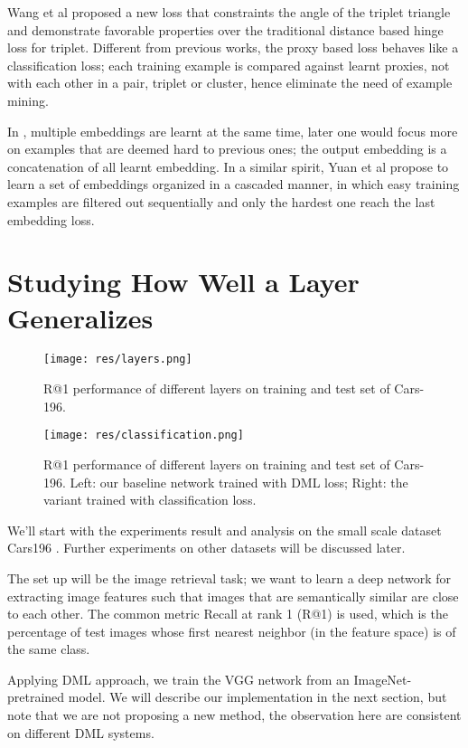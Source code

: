 \documentclass[10pt,twocolumn,letterpaper]{article}
\begin{document}
Wang et al \cite{wang2017deep} proposed a new loss that constraints the angle of the triplet triangle and demonstrate favorable properties over the traditional distance based hinge loss for triplet. Different from previous works, the proxy based loss \cite{movshovitz2017no} behaves like a classification loss; each training example is compared against learnt proxies, not with each other in a pair, triplet or cluster, hence eliminate the need of example mining.

In \cite{opitz2017bier}, multiple embeddings are learnt at the same time, later one would focus more on examples that are deemed hard to previous ones; the output embedding is a concatenation of all learnt embedding.
In a similar spirit, Yuan et al \cite{yuan2016hard} propose to learn a set of embeddings organized in a cascaded manner, in which easy training examples are filtered out sequentially and only the hardest one reach the last embedding loss. 

\section{Studying How Well a Layer Generalizes}

\begin{figure*}
  \texttt{[image: res/layers.png]}
  \caption{R@1 performance of different layers on training and test set of Cars-196.}
  \label{fig:layers}
\end{figure*}

\begin{figure}
  \texttt{[image: res/classification.png]}
  \caption{R@1 performance of different layers on training and test set of Cars-196. Left: our baseline network trained with DML loss; Right: the variant trained with classification loss.}
  \label{fig:classification}
\end{figure}
We'll start with the experiments result and analysis on the small scale dataset Cars196 \cite{KrauseStarkDengFei-Fei_3DRR2013}. Further experiments on other datasets will be discussed later.

The set up will be the image retrieval task; we want to learn a deep network for extracting image features such that images that are semantically similar are close to each other.
The common metric Recall at rank 1 (R@1) is used, which is the percentage of test images whose first nearest neighbor (in the feature space) is of the same class.

Applying DML approach, we train the VGG network from an ImageNet-pretrained model. We will describe our implementation in the next section, but note that we are not proposing a new method, the observation here are consistent on different DML systems. 
\end{document}

